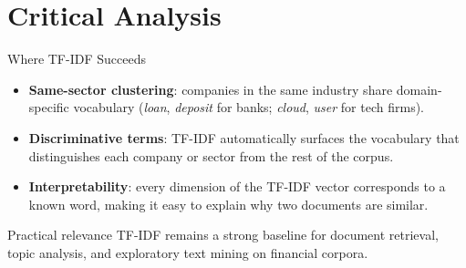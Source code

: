 \documentclass[aspectratio=169,11pt]{beamer}
\begin{document}
\section{Critical Analysis}

\begin{frame}{Where TF-IDF Succeeds}

\begin{itemize}
  \item \textbf{Same-sector clustering}: companies in the same
        industry share domain-specific vocabulary
        (\emph{loan}, \emph{deposit} for banks;
         \emph{cloud}, \emph{user} for tech firms).
  \item \textbf{Discriminative terms}: TF-IDF automatically
        surfaces the vocabulary that distinguishes each
        company or sector from the rest of the corpus.
  \item \textbf{Interpretability}: every dimension of the
        TF-IDF vector corresponds to a known word, making
        it easy to explain why two documents are similar.
\end{itemize}

\vspace{6pt}
\begin{block}{Practical relevance}
TF-IDF remains a strong baseline for document retrieval,
topic analysis, and exploratory text mining on financial
corpora.
\end{block}

\end{frame}
\end{document}
